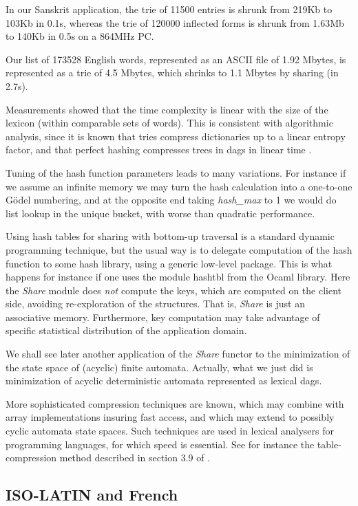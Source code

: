 \documentclass[12pt]{article}
\begin{document}
In our Sanskrit application, the trie of 11500 entries
is shrunk from 219Kb to 103Kb in 0.1s, whereas the trie of 120000 inflected
forms is shrunk from 1.63Mb to 140Kb in 0.5s on a 864MHz PC.

Our list of 173528 English words, represented as an ASCII file of 1.92
Mbytes, is represented as a trie of 4.5 Mbytes, which shrinks to 1.1
Mbytes by sharing (in 2.7s).

Measurements showed that the time complexity is linear with the size of
the lexicon (within comparable sets of words). This is consistent with
algorithmic analysis, since it is known that tries compress dictionaries
up to a linear entropy factor, and that perfect hashing compresses trees
in dags in linear time \cite{flajsipste}.

Tuning of the hash function parameters leads to many variations.
For instance if we assume an infinite memory we may turn the hash calculation
into a one-to-one G\"odel numbering, and at the opposite end taking
{\sl hash\_max} to 1 we would do list lookup in the unique bucket,
with worse than quadratic performance. 

Using hash tables for sharing with bottom-up traversal is a standard
dynamic programming technique, but the usual 
way is to delegate computation of the hash function to some hash library,
using a generic low-level package. This is what happens for instance
if one uses the module hashtbl from the Ocaml library. Here the 
{\sl Share} module does {\sl not} compute the keys, which are computed
on the client side, avoiding re-exploration of the structures. That is,
{\sl Share} is just an associative memory. Furthermore, key computation may 
take advantage of specific statistical distribution of the application domain.

We shall see later another application of the {\sl Share}
functor to the minimization of the state space of (acyclic) finite automata.
Actually, what we just did is minimization of acyclic deterministic 
automata represented as lexical dags. 

More sophisticated compression techniques are known, which may combine with
array implementations insuring fast access, and which may extend to possibly
cyclic automata state spaces. Such techniques are used in lexical analysers
for programming languages, for which speed is essential. See for instance
the table-compression method described in section 3.9 of \cite{asu}.

\subsection{ISO-LATIN and French}
\end{document}
